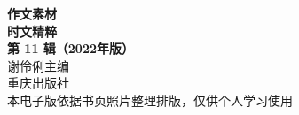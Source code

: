 \documentclass[11pt,a4paper,openany]{ctexbook}
\begin{document}
\begin{titlepage}
\centering
\vspace*{3cm}
{\color{zhubian}\Huge\bfseries 作文素材}\\[6pt]
{\color{zhubian}\Huge\bfseries 时文精粹}\\[18pt]
{\color{org}\Large\bfseries 第 11 辑（2022年版）}\\[30pt]
{\large 谢伶俐\quad 主编}\\[10pt]
{\normalsize 重庆出版社}\\[80pt]
{\small 本电子版依据书页照片整理排版，仅供个人学习使用}
\vfill
\end{titlepage}

\frontmatter
\tableofcontents

\mainmatter

\end{document}
